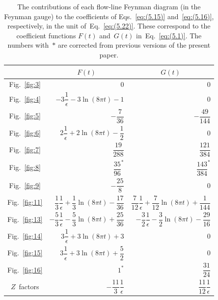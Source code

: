 \begin{table}
\caption{The contributions of each flow-line Feynman diagram (in the Feynman
gauge) to the coefficients of Eqs.~\eqref{eq:(5.15)} and~\eqref{eq:(5.16)},
respectively, in the unit of~Eq.~\eqref{eq:(5.22)}. These correspond to the
coefficient functions $F(t)$ and~$G(t)$ in~Eq.~\eqref{eq:(5.1)}.
The numbers with~$*$ are corrected from previous versions of the present paper.
}
\label{table:1}
\begin{center}
\renewcommand{\arraystretch}{2.2}
\setlength{\tabcolsep}{12pt}
\begin{tabular}{crr}
\toprule
 & \multicolumn{1}{c}{$F(t)$}
 & \multicolumn{1}{c}{$G(t)$} \\
\midrule
Fig.~\ref{fig:3}  & $0$ & $0$ \\
Fig.~\ref{fig:4}  & $-3\dfrac{1}{\epsilon}-3\ln(8\pi t)-1$ & $0$ \\
Fig.~\ref{fig:5}  & $-\dfrac{7}{36}$ & $-\dfrac{49}{144}$ \\
Fig.~\ref{fig:6}  & $2\dfrac{1}{\epsilon}+2\ln(8\pi t)-\dfrac{1}{2}$ & $0$ \\
Fig.~\ref{fig:7}  & $\dfrac{19}{288}$ & $\dfrac{121}{384}$ \\
Fig.~\ref{fig:8}  & $\dfrac{35}{96}^*$ & $\dfrac{143}{384}^*$ \\
Fig.~\ref{fig:9}  & $-\dfrac{25}{8}$ & $0$\\
Fig.~\ref{fig:11}  & $\dfrac{1}{3}\dfrac{1}{\epsilon}+\dfrac{1}{3}\ln(8\pi t)-\dfrac{17}{36}$ & $\dfrac{7}{12}\dfrac{1}{\epsilon}+\dfrac{7}{12}\ln(8\pi t)+\dfrac{1}{144}$\\
Fig.~\ref{fig:13}  & $-\dfrac{5}{3}\dfrac{1}{\epsilon}-\dfrac{5}{3}\ln(8\pi t)+\dfrac{25}{36}$ & $-\dfrac{3}{2}\dfrac{1}{\epsilon}-\dfrac{3}{2}\ln(8\pi t)-\dfrac{29}{16}$\\
Fig.~\ref{fig:14} & $3\dfrac{1}{\epsilon}+3\ln(8\pi t)+3$ & $0$ \\
Fig.~\ref{fig:15}  & $3\dfrac{1}{\epsilon}+3\ln(8\pi t)+\dfrac{5}{2}$ & $0$ \\
Fig.~\ref{fig:16}  & $1^*$ & $\dfrac{31}{24}$ \\
$Z$~factors & $-\dfrac{11}{3}\dfrac{1}{\epsilon}$ & $\dfrac{11}{12}\dfrac{1}{\epsilon}$ \\
\bottomrule
\end{tabular}
\end{center}
\end{table}

